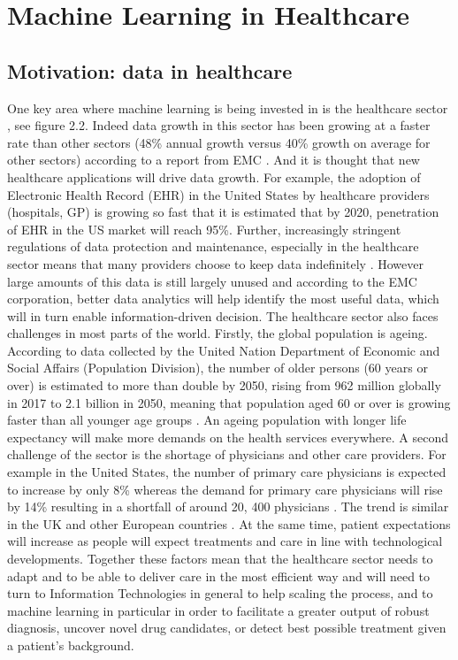 \section{Machine Learning in Healthcare}
\subsection{Motivation: data in healthcare}
One key area where machine learning is being invested in is the healthcare sector \citep{Obermeyer:2016ju,EMC:2014ve, Evans:sHGdqFvY}, see figure 2.2. Indeed data growth in this sector has been growing at a faster rate than other sectors (48\% annual growth versus 40\% growth on average for other sectors) according to a report from EMC \citep{EMC:2014ve}. And it is thought that new healthcare applications will drive data growth. For example, the adoption of Electronic Health Record (EHR) in the United States by healthcare providers (hospitals, GP) is growing so fast that it is estimated that by 2020, penetration of EHR in the US market will reach 95\%. Further, increasingly stringent regulations of data protection and maintenance, especially in the healthcare sector means that many providers choose to keep data indefinitely \citep{EMC:2014ve}. However large amounts of this data is still largely unused and according to the EMC corporation, better data analytics will help identify the most useful data, which will in turn enable information-driven decision.\newline
The healthcare sector also faces challenges in most parts of the world. Firstly, the global population is ageing. According to data collected by the United Nation Department of Economic and Social Affairs (Population Division), the number of older persons (60 years or over) is estimated to more than double by 2050, rising from 962 million globally in 2017 to 2.1 billion in 2050, meaning that population aged 60 or over is growing faster than all younger age groups \citep{UnitedNations:2017wd}. An ageing population with longer life expectancy will make more demands on the health services everywhere. A second challenge of the sector is the shortage of physicians and other care providers. For example in the United States, the number of primary care physicians is expected to increase by only 8\% whereas the demand for primary care physicians will rise by 14\% resulting in a shortfall of around 20, 400 physicians \citep{EMC:2014ve}. The trend is similar in the UK and other European countries \citep{Campbell:ti}. At the same time, patient expectations will increase as people will expect treatments and care in line with technological developments.\newline
Together these factors  mean that the healthcare sector needs to adapt and to be able to deliver care in the most efficient way and will need to turn to Information Technologies in general to help scaling the process, and to machine learning in particular in order to facilitate a greater output of robust diagnosis, uncover novel drug candidates, or detect best possible treatment given a patient's background.\newline

